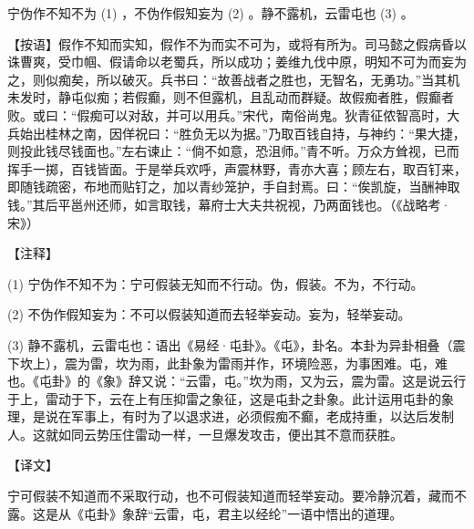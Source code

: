 \documentclass[12pt,UTF8]{ctexbook}
\begin{document}
宁伪作不知不为 (1) ，不伪作假知妄为 (2) 。静不露机，云雷屯也 (3) 。

【按语】假作不知而实知，假作不为而实不可为，或将有所为。司马懿之假病昏以诛曹爽，受巾帼、假请命以老蜀兵，所以成功；姜维九伐中原，明知不可为而妄为之，则似痴矣，所以破灭。兵书曰：“故善战者之胜也，无智名，无勇功。”当其机未发时，静屯似痴；若假癫，则不但露机，且乱动而群疑。故假痴者胜，假癫者败。或曰：“假痴可以对敌，并可以用兵。”宋代，南俗尚鬼。狄青征侬智高时，大兵始出桂林之南，因佯祝曰：“胜负无以为据。”乃取百钱自持，与神约：“果大捷，则投此钱尽钱面也。”左右谏止：“倘不如意，恐沮师。”青不听。万众方耸视，已而挥手一掷，百钱皆面。于是举兵欢呼，声震林野，青亦大喜；顾左右，取百钉来，即随钱疏密，布地而贴钉之，加以青纱笼护，手自封焉。曰：“俟凯旋，当酬神取钱。”其后平邕州还师，如言取钱，幕府士大夫共祝视，乃两面钱也。（《战略考·宋》）





【注释】


(1) 宁伪作不知不为：宁可假装无知而不行动。伪，假装。不为，不行动。

(2) 不伪作假知妄为：不可以假装知道而去轻举妄动。妄为，轻举妄动。

(3) 静不露机，云雷屯也：语出《易经·屯卦》。《屯》，卦名。本卦为异卦相叠（震下坎上），震为雷，坎为雨，此卦象为雷雨并作，环境险恶，为事困难。屯，难也。《屯卦》的《象》辞又说：“云雷，屯。”坎为雨，又为云，震为雷。这是说云行于上，雷动于下，云在上有压抑雷之象征，这是屯卦之卦象。此计运用屯卦的象理，是说在军事上，有时为了以退求进，必须假痴不癫，老成持重，以达后发制人。这就如同云势压住雷动一样，一旦爆发攻击，便出其不意而获胜。





【译文】


宁可假装不知道而不采取行动，也不可假装知道而轻举妄动。要冷静沉着，藏而不露。这是从《屯卦》象辞“云雷，屯，君主以经纶”一语中悟出的道理。
\end{document}
